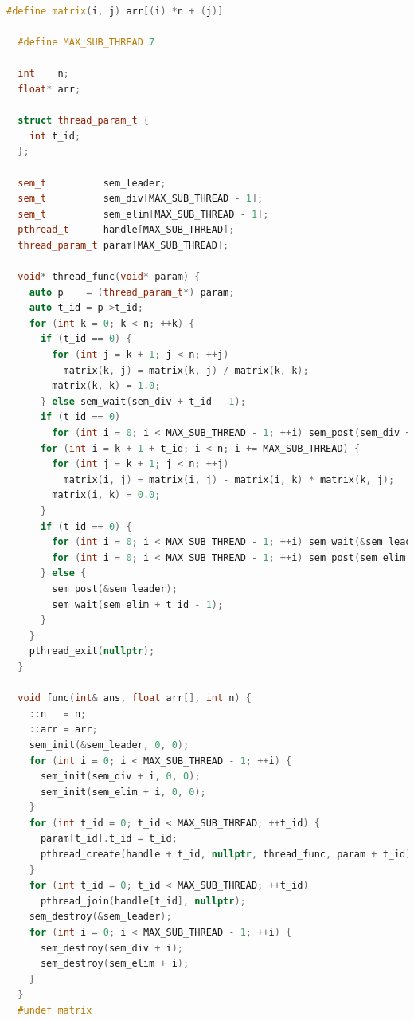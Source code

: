 \documentclass[a4paper]{article}
\begin{document}
\begin{lstlisting}[title=线程池+信号量同步+工作线程执行除法,frame=trbl,language={C++}]
  #define matrix(i, j) arr[(i) *n + (j)]

  #define MAX_SUB_THREAD 7

  int    n;
  float* arr;

  struct thread_param_t {
    int t_id;
  };

  sem_t          sem_leader;
  sem_t          sem_div[MAX_SUB_THREAD - 1];
  sem_t          sem_elim[MAX_SUB_THREAD - 1];
  pthread_t      handle[MAX_SUB_THREAD];
  thread_param_t param[MAX_SUB_THREAD];

  void* thread_func(void* param) {
    auto p    = (thread_param_t*) param;
    auto t_id = p->t_id;
    for (int k = 0; k < n; ++k) {
      if (t_id == 0) {
        for (int j = k + 1; j < n; ++j)
          matrix(k, j) = matrix(k, j) / matrix(k, k);
        matrix(k, k) = 1.0;
      } else sem_wait(sem_div + t_id - 1);
      if (t_id == 0)
        for (int i = 0; i < MAX_SUB_THREAD - 1; ++i) sem_post(sem_div + i);
      for (int i = k + 1 + t_id; i < n; i += MAX_SUB_THREAD) {
        for (int j = k + 1; j < n; ++j)
          matrix(i, j) = matrix(i, j) - matrix(i, k) * matrix(k, j);
        matrix(i, k) = 0.0;
      }
      if (t_id == 0) {
        for (int i = 0; i < MAX_SUB_THREAD - 1; ++i) sem_wait(&sem_leader);
        for (int i = 0; i < MAX_SUB_THREAD - 1; ++i) sem_post(sem_elim + i);
      } else {
        sem_post(&sem_leader);
        sem_wait(sem_elim + t_id - 1);
      }
    }
    pthread_exit(nullptr);
  }

  void func(int& ans, float arr[], int n) {
    ::n   = n;
    ::arr = arr;
    sem_init(&sem_leader, 0, 0);
    for (int i = 0; i < MAX_SUB_THREAD - 1; ++i) {
      sem_init(sem_div + i, 0, 0);
      sem_init(sem_elim + i, 0, 0);
    }
    for (int t_id = 0; t_id < MAX_SUB_THREAD; ++t_id) {
      param[t_id].t_id = t_id;
      pthread_create(handle + t_id, nullptr, thread_func, param + t_id);
    }
    for (int t_id = 0; t_id < MAX_SUB_THREAD; ++t_id)
      pthread_join(handle[t_id], nullptr);
    sem_destroy(&sem_leader);
    for (int i = 0; i < MAX_SUB_THREAD - 1; ++i) {
      sem_destroy(sem_div + i);
      sem_destroy(sem_elim + i);
    }
  }
  #undef matrix
\end{lstlisting}
\end{document}
